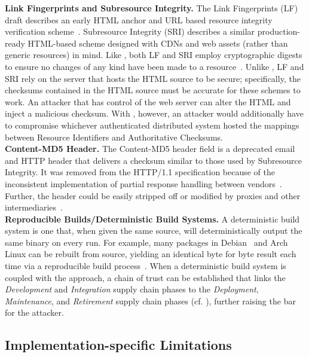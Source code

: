 \noindent\textbf{Link Fingerprints and Subresource Integrity.} The Link
Fingerprints (LF) draft describes an early HTML anchor and URL based resource
integrity verification scheme~\cite{LF}. Subresource Integrity (SRI) describes a
similar production-ready HTML-based scheme designed with CDNs and web assets
(rather than generic resources) in mind. Like \SYSTEM{}, both LF and SRI employ
cryptographic digests to ensure no changes of any kind have been made to a
resource~\cite{SRI}. Unlike \SYSTEM{}, LF and SRI rely on the server that hosts
the HTML source to be secure; specifically, the checksums contained in the HTML
source must be accurate for these schemes to work. An attacker that has control
of the web server can alter the HTML and inject a malicious checksum. With
\SYSTEM{}, however, an attacker would additionally have to compromise whichever
authenticated distributed system hosted the mappings between Resource
Identifiers and Authoritative Checksums. \\

\noindent\textbf{Content-MD5 Header.} The Content-MD5 header field is a
deprecated email and HTTP header that delivers a checksum similar to those used
by Subresource Integrity. It was removed from the HTTP/1.1 specification because
of the inconsistent implementation of partial response handling between
vendors~\cite{HTTP1.1}. Further, the header could be easily stripped off or
modified by proxies and other intermediaries~\cite{MD5Header}. \\

\noindent\textbf{Reproducible Builds/Deterministic Build Systems.} A
deterministic build system is one that, when given the same source, will
deterministically output the same binary on every run. For example, many
packages in Debian~\cite{ReproBuildsDebian} and Arch Linux can be rebuilt from
source, yielding an identical byte for byte result each time via a reproducible
build process~\cite{ReproBuilds}. When a deterministic build system is coupled
with the \SYSTEM{} approach, a chain of trust can be established that links the
\emph{Development} and \emph{Integration} supply chain phases to the
\emph{Deployment}, \emph{Maintenance}, and \emph{Retirement} supply chain phases
(cf. ), further raising the bar for the attacker.

\subsection{Implementation-specific Limitations}

